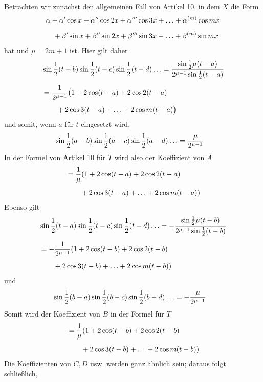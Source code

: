 \begingroup
\renewcommand{\arraystretch}{1.45}
Betrachten wir zunächst den allgemeinen Fall von Artikel 10, in dem \(X\) die Form
\[
\begin{aligned}
&\alpha+\alpha'\cos x+\alpha''\cos2x+\alpha'''\cos3x+\mathinner{.\,.\,.}+\alpha^{(m)}\cos mx\\[5pt]
&\quad+\beta'\sin x+\beta''\sin2x+\beta'''\sin3x+\mathinner{.\,.\,.}+\beta^{(m)}\sin mx
\end{aligned}
\]
\noindent hat und \(\mu=2m+1\) ist. Hier gilt daher
\[
\begin{aligned}
&\sin\frac12(t-b)\sin\frac12(t-c)\sin\frac12(t-d)\mathinner{.\,.\,.}=\frac{\sin\frac12\mu(t-a)}{2^{\mu-1}\sin\frac12(t-a)}\\[5pt]
&=\frac{1}{2^{\mu-1}}\bigl(1+2\cos(t-a)+2\cos2(t-a)\\[5pt]&\qquad{}+2\cos3(t-a)+\mathinner{.\,.\,.}+2\cos m(t-a)\bigr)
\end{aligned}
\]
\noindent und somit, wenn \(a\) für \(t\) eingesetzt wird,
\[
\begin{aligned}
&\sin\frac12(a-b)\sin\frac12(a-c)\sin\frac12(a-d)\mathinner{.\,.\,.}=\frac{\mu}{2^{\mu-1}}
\end{aligned}
\]
In der Formel von Artikel 10 für \(T\) wird also der Koeffizient von \(A\)
\[
\begin{aligned}
&=\frac{1}{\mu}(1+2\cos(t-a)+2\cos2(t-a)\\[5pt]&\qquad{}+2\cos3(t-a)+\mathinner{.\,.\,.}+2\cos m(t-a))
\end{aligned}
\]
Ebenso gilt
\[
\begin{aligned}
&\sin\frac12(t-a)\sin\frac12(t-c)\sin\frac12(t-d)\mathinner{.\,.\,.}
=-\frac{\sin\frac12\mu(t-b)}{2^{\mu-1}\sin\frac12(t-b)}\\[5pt]
&=-\frac{1}{2^{\mu-1}}(1+2\cos(t-b)+2\cos2(t-b)\\[5pt]&\qquad{}+2\cos3(t-b)+\mathinner{.\,.\,.}+2\cos m(t-b))
\end{aligned}
\]
und
\[
\begin{aligned}
&\sin\frac12(b-a)\sin\frac12(b-c)\sin\frac12(b-d)\mathinner{.\,.\,.}=-\frac{\mu}{2^{\mu-1}}
\end{aligned}
\]
Somit wird der Koeffizient von \(B\) in der Formel für \(T\)
\[
\begin{aligned}
&=\frac{1}{\mu}(1+2\cos(t-b)+2\cos2(t-b)\\[5pt]&\qquad{}+2\cos3(t-b)+\mathinner{.\,.\,.}+2\cos m(t-b))
\end{aligned}
\]
Die Koeffizienten von \(C,D\) usw. werden ganz ähnlich sein; daraus folgt schließlich,
